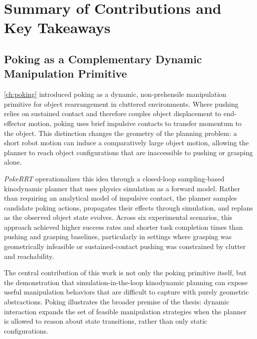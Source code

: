 \section{Summary of Contributions and Key Takeaways}
\label{sec:discussion:contributions}

\subsection{Poking as a Complementary Dynamic Manipulation Primitive}
\label{sec:discussion:poking}

\cref{ch:poking} introduced poking as a dynamic, non-prehensile manipulation primitive for object rearrangement in cluttered environments.
Where pushing relies on sustained contact and therefore couples object displacement to end-effector motion, poking uses brief impulsive contacts to transfer momentum to the object.
This distinction changes the geometry of the planning problem: a short robot motion can induce a comparatively large object motion, allowing the planner to reach object configurations that are inaccessible to pushing or grasping alone.

\textit{PokeRRT} operationalizes this idea through a closed-loop sampling-based kinodynamic planner that uses physics simulation as a forward model.
Rather than requiring an analytical model of impulsive contact, the planner samples candidate poking actions, propagates their effects through simulation, and replans as the observed object state evolves.
Across six experimental scenarios, this approach achieved higher success rates and shorter task completion times than pushing and grasping baselines, particularly in settings where grasping was geometrically infeasible or sustained-contact pushing was constrained by clutter and reachability.

The central contribution of this work is not only the poking primitive itself, but the demonstration that simulation-in-the-loop kinodynamic planning can expose useful manipulation behaviors that are difficult to capture with purely geometric abstractions.
Poking illustrates the broader premise of the thesis: dynamic interaction expands the set of feasible manipulation strategies when the planner is allowed to reason about state transitions, rather than only static configurations.



